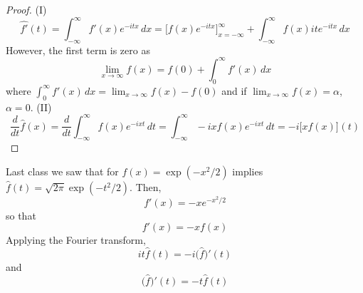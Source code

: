 \vspace{2ex}
\begin{proof}
(I)
\[\hat{f'}(t)=\int ^{\infty }_{-\infty }f'(x)e^{-itx}\,dx=\Big[f(x)e^{-itx}\Big]^{\infty }_{x=-\infty }+\int ^{\infty }_{-\infty }f(x)ite^{-itx}\,dx\]
However, the first term is zero as
\[\lim _{x\rightarrow \infty }f(x)=f(0)+\int ^{\infty }_{0}f'(x)\,dx\]
where $\int ^{\infty }_{0}f'(x)\,dx=\lim _{x\rightarrow \infty }f(x)-f(0)$ and if $\lim _{x\rightarrow \infty }f(x)=\alpha $, $\alpha =0$. 
(II) 
\[\dfrac{d }{d t}\hat{f}(x)=\dfrac{d }{d t}\int ^{\infty }_{-\infty }f(x)e^{-ixt}\,dt=\int ^{\infty }_{-\infty }-ixf(x)e^{-ixt}\,dt=-i\Big[xf(x)\Big]^{\widehat{}} (t)  \]
\end{proof}
\vspace{2ex}
\begin{ex}
Last class we saw that for $f(x)=\exp (-x^2/2)$ implies $\hat{f}(t)=\sqrt{2\pi }\exp (-t^2/2)$. Then,
\[f'(x)=-xe^{-x^2/2}\]
so that
\[f'(x)=-xf(x)\]
Applying the Fourier transform, 
\[it\hat{f}(t)=-i\big(\hat{f}\big)'(t)\]
and
\[\big(\hat{f}\big)'(t)=-t\hat{f}(t)\]
\end{ex}
\vspace{2ex}

